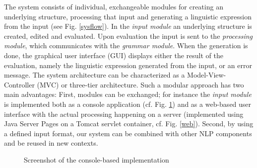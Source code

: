 \documentclass[a4paper, halfparskip, onecolumn, abstractoff, final]{scrartcl}
\begin{document}


The system consists of individual, exchangeable modules for creating an underlying structure, processing that input and generating a linguistic expression from the input (see Fig. \ref{sysflow}). In the \emph{input module} an underlying structure is created, edited and evaluated. Upon evaluation the input is sent to the \emph{processing module}, which communicates with the \emph{grammar module}. When the generation is done, the graphical user interface (GUI) displays either the result of the evaluation, namely the linguistic expression generated from the input, or an error message. The system architecture can be characterized as a Model-View-Controller (MVC) or three-tier architecture. Such a modular approach has two main advantages: First, modules can be exchanged; for instance the \emph{input module} is implemented both as a console application (cf. Fig. \ref{console}) and as a web-based user interface with the actual processing happening on a server (implemented using Java Server Pages on a Tomcat servlet container, cf. Fig. \ref{web}). Second, by using a defined input format, our system can be combined with other NLP components and be reused in new contexts.

\begin{figure}
\begin{center}
\end{center}
\caption{Screenshot of the console-based implementation} \label{console}
\end{figure}
\end{document}
